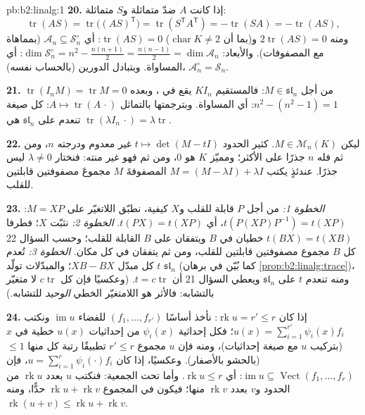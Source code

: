 \begin{solution}{pb:b2:linalg:1}
\textbf{20.} إذا كانت $A$ ضدّ متماثلة و$S$ متماثلة:
\[
\operatorname{tr}(AS) = \operatorname{tr}\bigl((AS)^{\mathsf
T}\bigr) = \operatorname{tr}(S^{\mathsf T}A^{\mathsf T}) =
-\operatorname{tr}(SA) = -\operatorname{tr}(AS),
\]
ومنه $2\operatorname{tr}(AS) = 0$ و(بما أن $\operatorname{char} K \neq
2$) $\operatorname{tr}(AS) = 0$: أي $\mathcal{A}_n \subseteq
\mathcal{S}_n^\circ$ (بمماهاة  مع المصفوفات).
والأبعاد: $\dim\mathcal{S}_n^\circ = n^2 - \frac{n(n+1)}2 =
\frac{n(n-1)}2 = \dim\mathcal{A}_n$: أي المساواة. وبتبادل الدورين
(بالحساب نفسه)، $\mathcal{A}_n^\circ = \mathcal{S}_n$.

\textbf{21.} $\operatorname{tr}(I_nM) = \operatorname{tr} M = 0$
من أجل $M \in \mathfrak{sl}_n$: فالمستقيم $KI_n$ يقع في
، وبعده $n^2 - (n^2 - 1) = 1$: أي المساواة.
وبترجمتها بالتماثل $A \mapsto
\operatorname{tr}(A\,\cdot)$: كل صيغة تنعدم على
$\mathfrak{sl}_n$ هي $\operatorname{tr}(\lambda I_n\,\cdot) =
\lambda\operatorname{tr}$.

\textbf{22.} ليكن $M \in \mathcal{M}_n(K)$. كثير الحدود $t
\mapsto \det(M - tI)$ غير معدوم ودرجته $n$، ومن ثم فله
$n$ جذرًا على الأكثر؛ ومميّز $K$ هو $0$، ومن ثم فهو غير منته: فنختار
$\lambda \neq 0$ ليس جذرًا. عندئذٍ يكتب $M = (M - \lambda I) +
\lambda I$ المصفوفةَ $M$ مجموعَ مصفوفتين قابلتين للقلب.

\textbf{23.} \emph{الخطوة 1:} من أجل $P$ قابلة للقلب و$X$
كيفية، نطبّق اللاتغيّر على $M = XP$: $t(P(XP)P^{-1}) = t(XP)$،
أي $t(PX) = t(XP)$. \emph{الخطوة 2:} نثبّت $X$؛ فطرفا
$t(BX) = t(XB)$ خطيان في $B$ ويتفقان على $B$ القابلة للقلب؛
وحسب السؤال 22 كل $B$ مجموع مصفوفتين قابلتين للقلب، ومن ثم
يتفقان في كل مكان. \emph{الخطوة 3:} تُعدم $t$ كل مبدّل $XB
- BX$؛ والمبدّلات تولّد $\mathfrak{sl}_n$ (كما بُيّن في
برهان \cref{prop:b2:linalg:trace})، ومنه تنعدم $t$ على
$\mathfrak{sl}_n$ ويعطي السؤال 21 أن $t =
c\operatorname{tr}$. (وعكسيًا فإن كل $c\operatorname{tr}$
لا متغيّر بالتشابه: فالأثر هو اللامتغيّر الخطي \emph{الوحيد}
للتشابه.)

\textbf{24.} إذا كان $\operatorname{rk} u = r' \leq r$: نأخذ أساسًا
$(f_1, \dots, f_{r'})$ للفضاء $\operatorname{im} u$ ونكتب $u(x)
= \sum_{i=1}^{r'} \psi_i(x) f_i$؛ فكل إحداثية $\psi_i(x)$ من
إحداثيات $u(x)$ خطية في $x$ (بتركيب $u$ مع صيغة
إحداثيات)، ومنه فإن $u$ مجموع $r' \leq r$ تطبيقًا رتبة كل منها $\leq1$ (بالحشو
بالأصفار). وعكسيًا، إذا كان $u = \sum_{i=1}^r \psi_i(\cdot)f_i$،
فإن $\operatorname{im} u \subseteq \operatorname{Vect}(f_1,
\dots, f_r)$: أي $\operatorname{rk} u \leq r$. وأما تحت الجمعية: فنكتب
$u$ بعدد $\operatorname{rk} u$ من الحدود و$v$ بعدد
$\operatorname{rk} v$ منها؛ فيكون في المجموع $\operatorname{rk} u +
\operatorname{rk} v$ حدًّا، ومنه $\operatorname{rk}(u + v) \leq
\operatorname{rk} u + \operatorname{rk} v$.


\end{solution}
